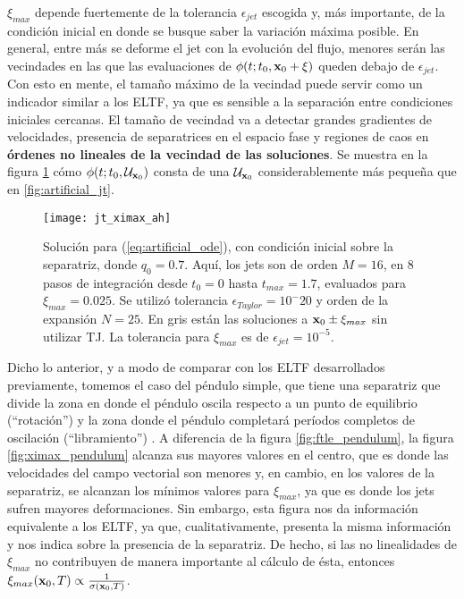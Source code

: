 $\xi_{max}$ depende fuertemente de la tolerancia $\epsilon_{jet}$ escogida y, más importante, de la condición inicial en donde se busque saber la variación máxima posible. En general, entre más se deforme el jet con la evolución del flujo, menores serán las vecindades en las que las evaluaciones de $\phi(t;t_0,\mathbf{x}_0 + \xi)$ queden debajo de $\epsilon_{jet}$. Con esto en mente, el tamaño máximo de la vecindad puede servir como un indicador similar a los ELTF, ya que es sensible a la separación entre condiciones iniciales cercanas. El tamaño de vecindad va a detectar grandes gradientes de velocidades, presencia de separatrices en el espacio fase y regiones de caos en \textbf{órdenes no lineales de la vecindad de las soluciones}. Se muestra en la figura \ref{fig:jt_ximax_ah} cómo $\phi(t;t_0,\mathcal{U}_{\mathbf{x}_0} )$ consta de una $\mathcal{U}_{\mathbf{x}_0}$ considerablemente más pequeña que en \ref{fig:artificial_jt}.

\begin{figure}[h!]
 \centering
 \texttt{[image: jt\_ximax\_ah]}
 \caption{Solución para (\ref{eq:artificial_ode}), con condición inicial sobre la separatriz, donde $q_0 = 0.7$. Aquí, los jets son de orden $M=16$, en $8$ pasos de integración desde $t_0 = 0$ hasta $t_{max} = 1.7$, evaluados para $\xi_{max} = 0.025$. Se utilizó tolerancia $\epsilon_{Taylor} = 10^-{20}$ y orden de la expansión $N=25$. En gris están las soluciones a $\mathbf{x}_0 \pm \xi_{max}$ sin utilizar TJ. La tolerancia para $\xi_{max}$ es de $\epsilon_{jet} = 10^{-5}$.}
 \label{fig:jt_ximax_ah}
\end{figure}

Dicho lo anterior, y a modo de comparar con los ELTF desarrollados previamente, tomemos el caso del péndulo simple, que tiene una separatriz que divide la zona en donde el péndulo oscila respecto a un punto de equilibrio (``rotación'') y la zona donde el péndulo completará períodos completos de oscilación (``libramiento'') . A diferencia de la figura \ref{fig:ftle_pendulum}, la figura \ref{fig:ximax_pendulum} alcanza sus mayores valores en el centro, que es donde las velocidades del campo vectorial son menores y, en cambio, en los valores de la separatriz, se alcanzan los mínimos valores para $\xi_{max}$, ya que es donde los jets sufren mayores deformaciones. Sin embargo, esta figura nos da información equivalente a los ELTF, ya que, cualitativamente, presenta la misma información y nos indica sobre la presencia de la separatriz. De hecho, si las no linealidades de $\xi_{max}$ no contribuyen de manera importante al cálculo de ésta, entonces $\xi_{max}(\mathbf{x}_0,T) \propto \frac{1}{\sigma(\mathbf{x}_0,T)}$. 


